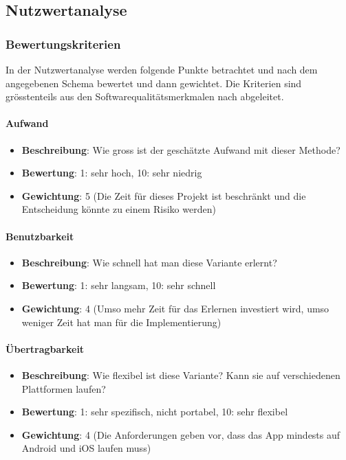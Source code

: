\newpage
\subsection{Nutzwertanalyse}\label{architektur_nutzwertanalyse}

\subsubsection{Bewertungskriterien}\label{architektur_bewertungspunkte}

In der Nutzwertanalyse werden folgende Punkte betrachtet und nach dem angegebenen Schema bewertet und dann gewichtet. Die Kriterien sind grösstenteils aus den Softwarequalitätsmerkmalen nach \cite{iso_9126} abgeleitet.

\paragraph{Aufwand}
\begin{itemize}
	\item \textbf{Beschreibung}: Wie gross ist der geschätzte Aufwand mit dieser Methode?
	\item \textbf{Bewertung}: 1: sehr hoch, 10: sehr niedrig
	\item \textbf{Gewichtung}: 5 (Die Zeit für dieses Projekt ist beschränkt und die Entscheidung könnte zu einem Risiko werden)
\end{itemize}

\paragraph{Benutzbarkeit}
\begin{itemize}
	\item \textbf{Beschreibung}: Wie schnell hat man diese Variante erlernt? 
	\item \textbf{Bewertung}: 1: sehr langsam, 10: sehr schnell
	\item \textbf{Gewichtung}: 4 (Umso mehr Zeit für das Erlernen investiert wird, umso weniger Zeit hat man für die Implementierung)
\end{itemize}

\paragraph{Übertragbarkeit}
\begin{itemize}
	\item \textbf{Beschreibung}: Wie flexibel ist diese Variante? Kann sie auf verschiedenen Plattformen laufen? 
	\item \textbf{Bewertung}: 1: sehr spezifisch, nicht portabel, 10: sehr flexibel
	\item \textbf{Gewichtung}: 4 (Die Anforderungen geben vor, dass das App mindests auf Android und iOS laufen muss)
\end{itemize}

